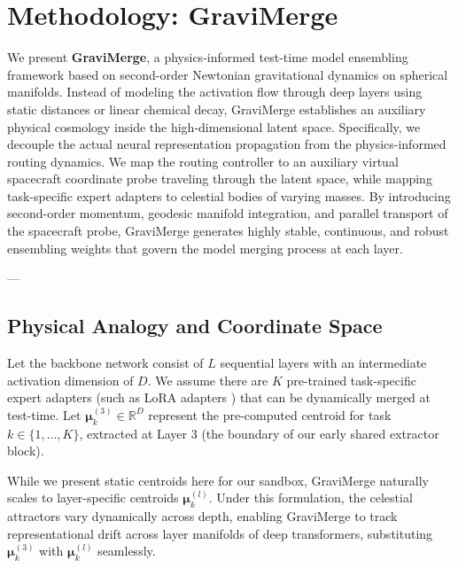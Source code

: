 \section{Methodology: GraviMerge}
\label{sec:method}

We present \textbf{GraviMerge}, a physics-informed test-time model ensembling framework based on second-order Newtonian gravitational dynamics on spherical manifolds. Instead of modeling the activation flow through deep layers using static distances or linear chemical decay, GraviMerge establishes an auxiliary physical cosmology inside the high-dimensional latent space. Specifically, we decouple the actual neural representation propagation from the physics-informed routing dynamics. We map the routing controller to an auxiliary virtual spacecraft coordinate probe traveling through the latent space, while mapping task-specific expert adapters to celestial bodies of varying masses. By introducing second-order momentum, geodesic manifold integration, and parallel transport of the spacecraft probe, GraviMerge generates highly stable, continuous, and robust ensembling weights that govern the model merging process at each layer.

---

\vspace{-5pt}
\subsection{Physical Analogy and Coordinate Space}
Let the backbone network consist of $L$ sequential layers with an intermediate activation dimension of $D$. We assume there are $K$ pre-trained task-specific expert adapters (such as LoRA adapters \cite{hu21lora}) that can be dynamically merged at test-time. Let $\boldsymbol{\mu}_k^{(3)} \in \mathbb{R}^D$ represent the pre-computed centroid for task $k \in \{1, \dots, K\}$, extracted at Layer 3 (the boundary of our early shared extractor block).

While we present static centroids here for our sandbox, GraviMerge naturally scales to layer-specific centroids $\boldsymbol{\mu}_k^{(l)}$. Under this formulation, the celestial attractors vary dynamically across depth, enabling GraviMerge to track representational drift across layer manifolds of deep transformers, substituting $\boldsymbol{\mu}_k^{(3)}$ with $\boldsymbol{\mu}_k^{(l)}$ seamlessly.

